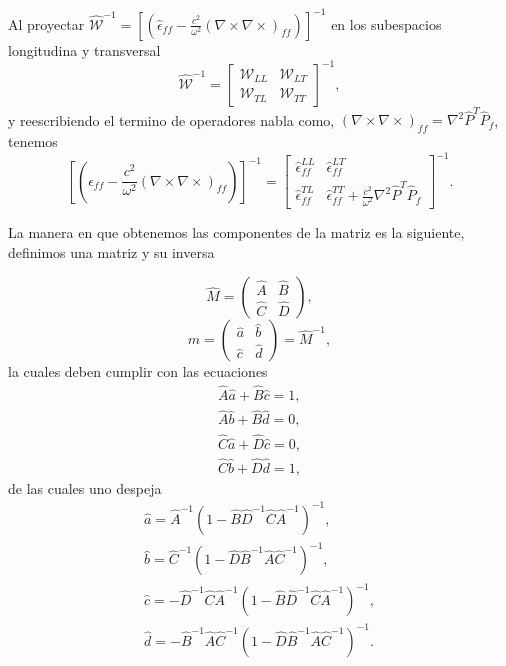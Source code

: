 \documentclass[12pt]{article}
\begin{document}
Al proyectar $\hat{\mathcal{W}}^{-1}=
\left[(\hat{\epsilon}_{ff}-\frac{c^{2}}{\omega^{2}}(\nabla \times
  \nabla \times)_{ff})\right]^{-1}$ en los subespacios longitudina y
transversal
\[\hat{\mathcal{W}}^{-1}=\left[
    \begin{array}{cc}
    \mathcal{W}_{LL} &  \mathcal{W}_{LT} \\
    \mathcal{W}_{TL} &  \mathcal{W}_{TT}
    \end{array}
    \right]^{-1}, \] y reescribiendo el termino de operadores nabla
como, $(\nabla \times \nabla \times)_{ff} = \nabla
^{2}\hat{P}^{T}\hat{P}_{f}$, tenemos
\begin{equation}
  \label{MatrizdeProyeccionesdeW}
  \left[(\hat{\epsilon}_{ff}-\frac{c^{2}}{\omega^{2}}(\nabla \times \nabla \times)_{ff})\right]^{-1} = \left[
  \begin{array}{cc}
    \hat{\epsilon}_{ff}^{LL} & \hat{\epsilon}_{ff}^{LT}
    \\ \hat{\epsilon}_{ff}^{TL} & \hat{\epsilon}_{ff}^{TT}+
    \frac{c^{2}}{\omega^{2}}\nabla ^{2}\hat{P}^{T}\hat{P}_{f}
  \end{array}
  \right]^{-1}.
\end{equation}

La manera en que obtenemos las componentes de la matriz es la
siguiente, definimos una matriz y su inversa

\[ \hat{M} = \left(
\begin{array}{cc}
  \hat{A} &  \hat{B} \\
   \hat{C} &  \hat{D}
\end{array}\right),
\] 
\[ \hat{m} =\left( 
\begin{array}{cc}
   \hat{a} &  \hat{b} \\
   \hat{c} &  \hat{d}
\end{array}\right) = \hat{M}^{-1},
\] 
la cuales deben cumplir con las ecuaciones
\begin{equation}
  \begin{split}
    \hat{A} \hat{a}+ \hat{B} \hat{c} = 1, \\
    \hat{A} \hat{b}+ \hat{B} \hat{d} = 0, \\
    \hat{C} \hat{a}+ \hat{D} \hat{c} = 0, \\
    \hat{C} \hat{b}+ \hat{D} \hat{d} = 1,
  \end{split}
\end{equation}
de las cuales uno despeja
\begin{equation}
  \label{eqsalgebraicas}
  \begin{split}
    \hat{a} = \hat{A}^{-1}(1-\hat{B}\hat{D}^{-1}\hat{C}\hat{A}^{-1})^{-1}, \\
    \hat{b} = \hat{C}^{-1}(1-\hat{D}\hat{B}^{-1}\hat{A}\hat{C}^{-1})^{-1}, \\
    \hat{c} = - \hat{D}^{-1}\hat{C}\hat{A}^{-1}(1-\hat{B}\hat{D}^{-1}\hat{C}\hat{A}^{-1})^{-1}, \\
    \hat{d} = - \hat{B}^{-1}\hat{A} \hat{C}^{-1}(1-\hat{D}\hat{B}^{-1}\hat{A}\hat{C}^{-1})^{-1}.
  \end{split}
\end{equation}
\end{document}
